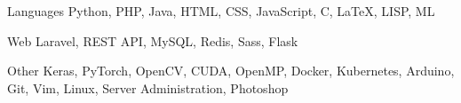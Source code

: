 

\begin{cvskills}

  \cvskill
    {Languages} %
    {Python, PHP, Java, HTML, CSS, JavaScript, C, \LaTeX, LISP, ML} %

  \cvskill
    {Web} %
    {Laravel, REST API, MySQL, Redis, Sass, Flask} %

  \cvskill
    {Other} %
    {Keras, PyTorch, OpenCV, CUDA, OpenMP, Docker, Kubernetes, Arduino, Git, Vim, Linux, Server Administration, Photoshop} %

\end{cvskills}
